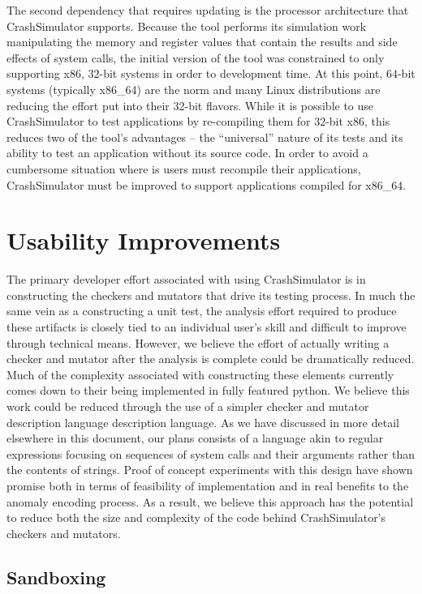 \documentclass[twocolumn]{article}
\begin{document}
The second dependency that requires updating is the processor architecture
that CrashSimulator supports.  Because the tool performs its simulation
work manipulating the memory and register values that contain the results
and side effects of system calls, the initial version of the tool was
constrained to only supporting x86, 32-bit systems in order to development
time.  At this point, 64-bit systems (typically x86\_64) are the norm and
many Linux distributions are reducing the effort put into their 32-bit
flavors.  While it is possible to use CrashSimulator to test applications
by re-compiling them for 32-bit x86, this reduces two of the tool's
advantages -- the ``universal'' nature of its tests and its ability to test
an application without its source code.  In order to avoid a cumbersome
situation where is users must recompile their applications, CrashSimulator
must be improved to support applications compiled for x86\_64.


\section{Usability Improvements}

The primary developer effort associated with using CrashSimulator is in
constructing the checkers and mutators that drive its testing process.  In
much the same vein as a constructing a unit test, the analysis effort
required to produce these artifacts is closely tied to an individual user's
skill and difficult to improve through technical means.  However, we
believe the effort of actually writing a checker and mutator after the
analysis is complete could be dramatically reduced.  Much of the complexity
associated with constructing these elements currently comes down to their
being implemented in fully featured python.  We believe this work could be
reduced through the use of a simpler checker and mutator description
language description language.  As we have discussed in more detail
elsewhere in this document, our plans consists of a language akin to
regular expressions focusing on sequences of system calls and their
arguments rather than the contents of strings.  Proof of concept
experiments with this design have shown promise both in terms of
feasibility of implementation and in real benefits to the anomaly encoding
process.  As a result, we believe this approach has the potential to reduce
both the size and complexity of the code behind CrashSimulator's checkers
and mutators.

\subsection{Sandboxing}
\end{document}
